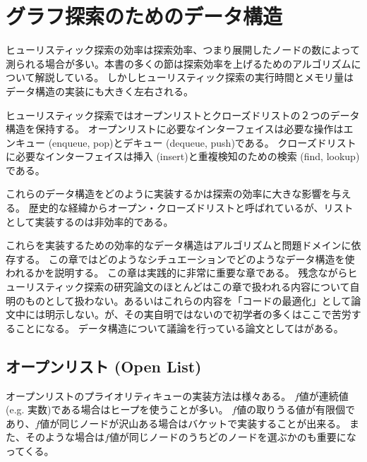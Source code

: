 \chapter{グラフ探索のためのデータ構造}
\label{ch:search-performance}

ヒューリスティック探索の効率は探索効率、つまり展開したノードの数によって測られる場合が多い。本書の多くの節は探索効率を上げるためのアルゴリズムについて解説している。
しかしヒューリスティック探索の実行時間とメモリ量はデータ構造の実装にも大きく左右される。

ヒューリスティック探索ではオープンリストとクローズドリストの２つのデータ構造を保持する。
オープンリストに必要なインターフェイスは必要な操作はエンキュー (enqueue, pop)とデキュー (dequeue, push)である。
クローズドリストに必要なインターフェイスは挿入 (insert)と重複検知のための検索 (find, lookup)である。

これらのデータ構造をどのように実装するかは探索の効率に大きな影響を与える。
歴史的な経緯からオープン・クローズドリストと呼ばれているが、リストとして実装するのは非効率的である。

これらを実装するための効率的なデータ構造はアルゴリズムと問題ドメインに依存する。
この章ではどのようなシチュエーションでどのようなデータ構造を使われるかを説明する。
この章は実践的に非常に重要な章である。
残念ながらヒューリスティック探索の研究論文のほとんどはこの章で扱われる内容について自明のものとして扱わない。あるいはこれらの内容を「コードの最適化」として論文中には明示しない。が、その実自明ではないので初学者の多くはここで苦労することになる。
データ構造について議論を行っている論文としては\cite{burns2012implementing}がある。




\section{オープンリスト (Open List)}
\label{sec:open-list}
オープンリストのプライオリティキューの実装方法は様々ある。
$f$値が連続値 (e.g. 実数)である場合はヒープを使うことが多い。
$f$値の取りうる値が有限個であり、$f$値が同じノードが沢山ある場合はバケットで実装することが出来る。
また、そのような場合は$f$値が同じノードのうちどのノードを選ぶかのも重要になってくる。


